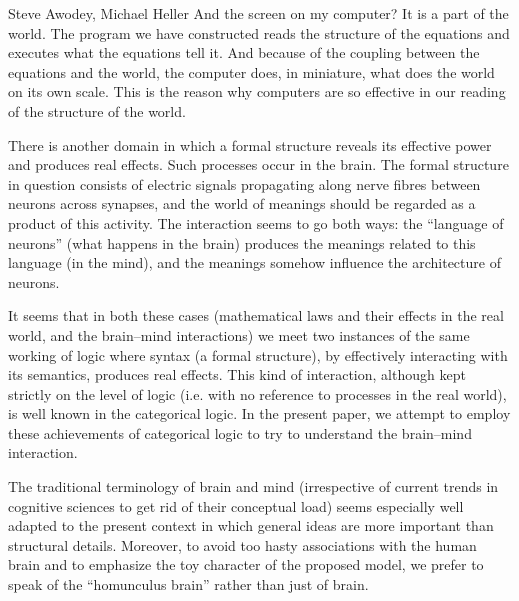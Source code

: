 \begin{artengenv2auth}{Steve Awodey, Michael Heller}
And the screen on my computer? It is a part of the world. The program we have constructed reads the structure of the equations and executes what the equations tell it. And because of the coupling between the equations and the world, the computer does, in miniature, what does the world on its own scale. This is the reason why computers are so effective in our reading of the structure of the world.

There is another domain in which a formal structure reveals its effective power and produces real effects. Such processes occur in the brain. The formal structure in question consists of electric signals propagating along nerve fibres between neurons across synapses, and the world of meanings should be regarded as a product of this activity. The interaction seems to go both ways: the ``language of neurons'' (what happens in the brain) produces the meanings related to this language (in the mind), and the meanings somehow influence the architecture of neurons. 

It seems that in both these cases (mathematical laws and their effects in the real world, and the brain--mind interactions) we meet two instances of the same working of logic where syntax (a formal structure), by effectively interacting with its semantics, produces real effects. This kind of interaction, although kept strictly on the level of logic (i.e. with no reference to processes in the real world), is well known in the categorical logic. In the present paper, we attempt to employ these achievements of categorical logic to try to understand the brain--mind interaction. 

The traditional terminology of brain and mind (irrespective of current trends in cognitive sciences to get rid of their conceptual load) seems especially well adapted to the present context in which general ideas are more important than structural details. Moreover,  to avoid too hasty associations with the human brain and to emphasize the toy character of the proposed model, we prefer to speak of the ``homunculus brain'' rather than just of brain.


\end{artengenv2auth}
